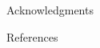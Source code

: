 \documentclass[final]{beamer}
\newlength{\sepwidth}
\newlength{\colwidth}
\newcommand{\separatorcolumn}{\begin{column}{\sepwidth}\end{column}}
\begin{document}
\begin{frame}[t]
\begin{columns}[t]
\begin{column}{\colwidth}
\begin{block}{Acknowledgments}
				\end{block}
				
				
				\begin{block}{References}
					
					\nocite{*}
					\footnotesize{}
					
				\end{block}
				
			\end{column}
			
			\separatorcolumn
		\end{columns}
	\end{frame}
	
\end{document}
